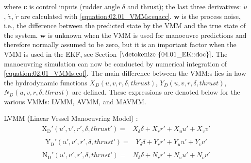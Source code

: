 \documentclass[review]{elsarticle}
\begin{document}
where \(\mathbf{c}\) is control inputs (rudder angle \(\delta\) and thrust); the last three derivatives: \(\dot{u}\), \(\dot{v}\), \(\dot{r}\) are calculated with \autoref{equation:02.01_VMMs:eqacc}.
\(\mathbf{w}\) is the process noise, i.e., the difference between the predicted state by the VMM and the true
state of the system. \(\mathbf{w}\) is unknown when the VMM is used for manoeuvre predictions and therefore normally
assumed to be zero, but it is an important factor when the VMM is used in the EKF, see Section \(\ref{\detokenize{04.01_EK::doc}}\).
The manoeuvring simulation can now be conducted by numerical integration of \autoref{equation:02.01_VMMs:eqf}. The main difference between the VMM:s lies in how the hydrodynamic functions \(X_D(u,v,r,\delta,thrust)\), \(Y_D(u,v,r,\delta,thrust)\), \(N_D(u,v,r,\delta,thrust)\) are defined. These expressions are denoted below for the various VMMs: LVMM, AVMM, and MAVMM.

 
LVMM (Linear Vessel Manoeuvring Model) \cite{matusiak_dynamics_2017}:
\begin{equation}\label{equation:02.01_VMMs:eqxlinear}
\begin{split}\begin{split}
\operatorname{X_{D}'}{\left(u',v',r',\delta,thrust' \right)} = & X_{\delta} \delta + X_{r} r' + X_{u} u' + X_{v} v' 
\end{split}\end{split}
\end{equation}\begin{equation}\label{equation:02.01_VMMs:eqylinear}
\begin{split}\begin{split}
\operatorname{Y_{D}'}{\left(u',v',r',\delta,thrust' \right)} = & Y_{\delta} \delta + Y_{r} r' + Y_{u} u' + Y_{v} v' 
\end{split}\end{split}
\end{equation}\begin{equation}\label{equation:02.01_VMMs:eqnlinear}
\begin{split}\begin{split}
\operatorname{N_{D}'}{\left(u',v',r',\delta,thrust' \right)} = & N_{\delta} \delta + N_{r} r' + N_{u} u' + N_{v} v' 
\end{split}\end{split}
\end{equation}
 
\end{document}
